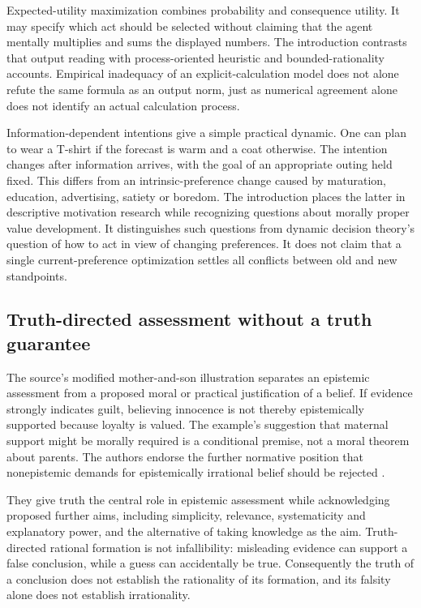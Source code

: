 Expected-utility maximization combines probability and consequence
utility. It may specify which act should be selected without claiming
that the agent mentally multiplies and sums the displayed numbers.
The introduction contrasts that output reading with process-oriented
heuristic and bounded-rationality accounts. Empirical inadequacy of an
explicit-calculation model does not alone refute the same formula as
an output norm, just as numerical agreement alone does not identify
an actual calculation process.

Information-dependent intentions give a simple practical dynamic.
One can plan to wear a T-shirt if the forecast is warm and a coat
otherwise. The intention changes after information arrives, with the
goal of an appropriate outing held fixed. This differs from an
intrinsic-preference change caused by maturation, education, advertising,
satiety or boredom. The introduction places the latter in descriptive
motivation research while recognizing questions about morally proper
value development. It distinguishes such questions from dynamic
decision theory's question of how to act in view of changing preferences.
It does not claim that a single current-preference optimization settles
all conflicts between old and new standpoints.

\subsection{Truth-directed assessment without a truth guarantee}

The source's modified mother-and-son illustration separates an
epistemic assessment from a proposed moral or practical justification
of a belief. If evidence strongly indicates guilt, believing innocence
is not thereby epistemically supported because loyalty is valued.
The example's suggestion that maternal support might be morally
required is a conditional premise, not a moral theorem about parents.
The authors endorse the further normative position that nonepistemic
demands for epistemically irrational belief should be rejected
\cite[pp.~16--17 and notes~22--23]{KnauffSpohn2021FrameworksIntro}.

They give truth the central role in epistemic assessment while
acknowledging proposed further aims, including simplicity, relevance,
systematicity and explanatory power, and the alternative of taking
knowledge as the aim. Truth-directed rational formation is not
infallibility: misleading evidence can support a false conclusion,
while a guess can accidentally be true. Consequently the truth of
a conclusion does not establish the rationality of its formation,
and its falsity alone does not establish irrationality.

